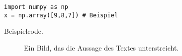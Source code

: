 

\blinddocument
{}
\begin{listing}[H]
\begin{verbatim}
import numpy as np
x = np.array([9,8,7]) # Beispiel
\end{verbatim}
\caption{Beispielcode.}
\label{lst:example}
\end{listing}


\begin{figure}[h]
  \centering
  \caption{Ein Bild, das die Aussage des Textes unterstreicht.}
  \label{fig:statement}
\end{figure}
